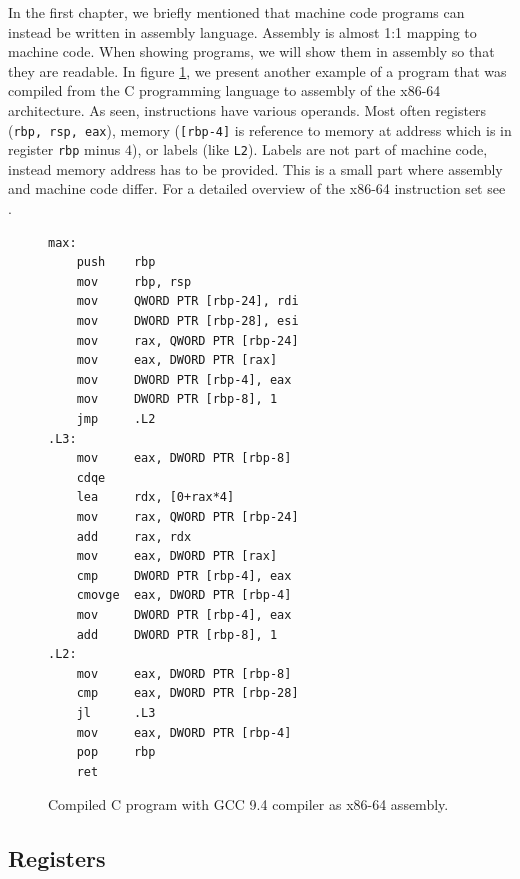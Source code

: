 In the first chapter, we briefly mentioned that machine code programs can
instead be written in assembly language. Assembly is almost 1:1 mapping to
machine code. When showing programs, we will show them in assembly so that they
are readable. In figure \ref{fig:assembly-example2}, we present another example
of a program that was compiled from the C programming language to assembly of
the x86-64 architecture. As seen, instructions have various operands. Most
often registers (\texttt{rbp, rsp, eax}), memory (\texttt{[rbp-4]} is reference
to memory at address which is in register \texttt{rbp} minus $4$), or labels
(like \texttt{L2}). Labels are not part of machine code, instead memory address
has to be provided. This is a small part where assembly and machine code
differ. For a detailed overview of the x86-64 instruction set see
\cite{intel-manual}.

\begin{figure}
    \begin{lstlisting}
max:
    push    rbp
    mov     rbp, rsp
    mov     QWORD PTR [rbp-24], rdi
    mov     DWORD PTR [rbp-28], esi
    mov     rax, QWORD PTR [rbp-24]
    mov     eax, DWORD PTR [rax]
    mov     DWORD PTR [rbp-4], eax
    mov     DWORD PTR [rbp-8], 1
    jmp     .L2
.L3:
    mov     eax, DWORD PTR [rbp-8]
    cdqe
    lea     rdx, [0+rax*4]
    mov     rax, QWORD PTR [rbp-24]
    add     rax, rdx
    mov     eax, DWORD PTR [rax]
    cmp     DWORD PTR [rbp-4], eax
    cmovge  eax, DWORD PTR [rbp-4]
    mov     DWORD PTR [rbp-4], eax
    add     DWORD PTR [rbp-8], 1
.L2:
    mov     eax, DWORD PTR [rbp-8]
    cmp     eax, DWORD PTR [rbp-28]
    jl      .L3
    mov     eax, DWORD PTR [rbp-4]
    pop     rbp
    ret
    \end{lstlisting}
    \caption{Compiled C program with GCC 9.4 compiler as x86-64 assembly.}
    \label{fig:assembly-example2}
\end{figure}

\subsection*{Registers}\label{subsection:registers}

